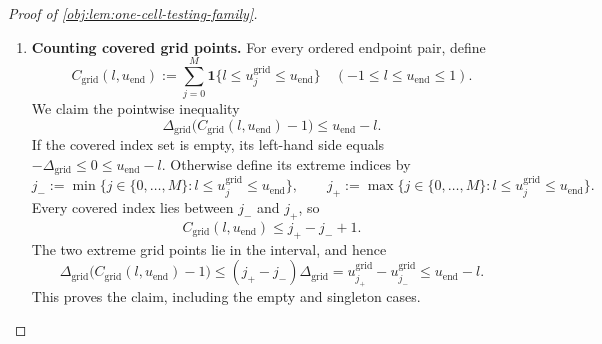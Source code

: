 \begin{proof}[Proof of \cref{obj:lem:one-cell-testing-family}]
\begin{enumerate}
For the comparison with the reference sample law, define
\[
\xi_j:=2N(j\Delta_{\mathrm{grid}})^2
\quad(j=0,\ldots,M).
\]
The width budget implies
\[
0\le\xi_j
\le2Nw_{\mathrm{grid}}^2
\le\frac{\varepsilon_\alpha^2}{8}
\le\frac18<1.
\]
The one-record identity and product calculation give
\[
\chi^2\!\left(
 \mathbb Q_{u_j^{\mathrm{grid}}}\Vert\mathbb Q_{1/2}
 \right)
\le e^{\xi_j}-1.
\]
For \(0\le\xi_j<1\), use the exponential bound
\(e^{\xi_j}\le(1-\xi_j)^{-1}\). Furthermore,
\[
\xi_j(1+\varepsilon_\alpha^2)
\le2\xi_j
\le\frac{\varepsilon_\alpha^2}{4}
\le\varepsilon_\alpha^2.
\]
Since \(1-\xi_j>0\), this implies
\[
e^{\xi_j}-1
\le\frac1{1-\xi_j}-1
=\frac{\xi_j}{1-\xi_j}
\le\varepsilon_\alpha^2.
\]
Consequently,
\[
\operatorname{TV}
 \bigl(\mathbb Q_{1/2},
       \mathbb Q_{u_j^{\mathrm{grid}}}\bigr)
\le
\frac12
\sqrt{\chi^2\!\left(
 \mathbb Q_{u_j^{\mathrm{grid}}}\Vert\mathbb Q_{1/2}
 \right)}
\le\frac{\varepsilon_\alpha}{2}
\le\varepsilon_\alpha.
\]
Applying \cref{obj:lem:randomized-kernel-tv-comparison} to the common interval kernel yields
\[
\operatorname{TV}(\mu_{\mathrm{ref}},\mu_j)
\le\varepsilon_\alpha.
\]
Thus, by the defining event bound for total variation,
\[
\mu_{\mathrm{ref}}(B_j)
\ge\mu_j(B_j)-\varepsilon_\alpha
\ge\beta_\alpha-\varepsilon_\alpha
=\frac{7\beta_\alpha}{8}.
\]

\item \textbf{Counting covered grid points.}
For every ordered endpoint pair, define
\[
C_{\mathrm{grid}}(l,u_{\mathrm{end}})
:=
\sum_{j=0}^{M}
\mathbf1\{l\le u_j^{\mathrm{grid}}\le u_{\mathrm{end}}\}
\quad(-1\le l\le u_{\mathrm{end}}\le1).
\]
We claim the pointwise inequality
\[
\Delta_{\mathrm{grid}}
\bigl(C_{\mathrm{grid}}(l,u_{\mathrm{end}})-1\bigr)
\le u_{\mathrm{end}}-l.
\]
If the covered index set is empty, its left-hand side equals
\(-\Delta_{\mathrm{grid}}\le0\le u_{\mathrm{end}}-l\). Otherwise define its extreme indices by
\[
j_-:=\min\{j\in\{0,\ldots,M\}:
                 l\le u_j^{\mathrm{grid}}\le u_{\mathrm{end}}\},
\qquad
j_+:=\max\{j\in\{0,\ldots,M\}:
                 l\le u_j^{\mathrm{grid}}\le u_{\mathrm{end}}\}.
\]
Every covered index lies between \(j_-\) and \(j_+\), so
\[
C_{\mathrm{grid}}(l,u_{\mathrm{end}})\le j_+-j_-+1.
\]
The two extreme grid points lie in the interval, and hence
\[
\Delta_{\mathrm{grid}}
 \bigl(C_{\mathrm{grid}}(l,u_{\mathrm{end}})-1\bigr)
\le
(j_+-j_-)\Delta_{\mathrm{grid}}
=
u_{j_+}^{\mathrm{grid}}-u_{j_-}^{\mathrm{grid}}
\le u_{\mathrm{end}}-l.
\]
This proves the claim, including the empty and singleton cases.


\end{enumerate}
\end{proof}
